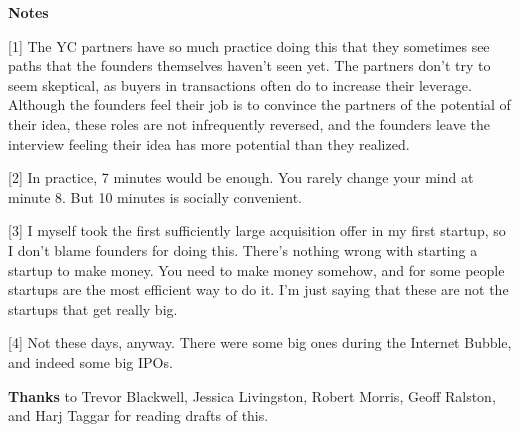 \textbf{Notes}

{[}1{]} The YC partners have so much practice doing this that they
sometimes see paths that the founders themselves haven't seen yet. The
partners don't try to seem skeptical, as buyers in transactions often do
to increase their leverage. Although the founders feel their job is to
convince the partners of the potential of their idea, these roles are
not infrequently reversed, and the founders leave the interview feeling
their idea has more potential than they realized.

{[}2{]} In practice, 7 minutes would be enough. You rarely change your
mind at minute 8. But 10 minutes is socially convenient.

{[}3{]} I myself took the first sufficiently large acquisition offer in
my first startup, so I don't blame founders for doing this. There's
nothing wrong with starting a startup to make money. You need to make
money somehow, and for some people startups are the most efficient way
to do it. I'm just saying that these are not the startups that get
really big.

{[}4{]} Not these days, anyway. There were some big ones during the
Internet Bubble, and indeed some big IPOs.

\textbf{Thanks} to Trevor Blackwell, Jessica Livingston, Robert Morris,
Geoff Ralston, and Harj Taggar for reading drafts of this.
